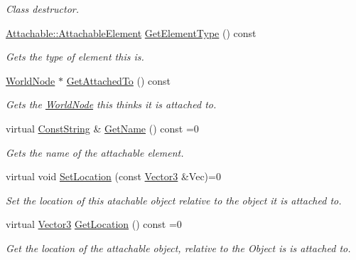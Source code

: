 \begin{DoxyCompactItemize}
\begin{DoxyCompactList}\small\item\em Class destructor. \item\end{DoxyCompactList}\item 
\hyperlink{classphys_1_1Attachable_acd1fca033e7cc0bb3024a92d466d213a}{Attachable::AttachableElement} \hyperlink{classphys_1_1Attachable_a57d60b84bd49bf35732164ae4244e576}{GetElementType} () const 
\begin{DoxyCompactList}\small\item\em Gets the type of element this is. \item\end{DoxyCompactList}\item 
\hyperlink{classphys_1_1WorldNode}{WorldNode} $\ast$ \hyperlink{classphys_1_1Attachable_a6df6034ed61c98d350378bdd7a3129f6}{GetAttachedTo} () const 
\begin{DoxyCompactList}\small\item\em Gets the \hyperlink{classphys_1_1WorldNode}{WorldNode} this thinks it is attached to. \item\end{DoxyCompactList}\item 
virtual \hyperlink{namespacephys_a5ce5049f8b4bf88d6413c47b504ebb31}{ConstString} \& \hyperlink{classphys_1_1Attachable_a0a07d727fa2630dc3550fd991ca28256}{GetName} () const =0
\begin{DoxyCompactList}\small\item\em Gets the name of the attachable element. \item\end{DoxyCompactList}\item 
virtual void \hyperlink{classphys_1_1Attachable_a3555ca694cfc9ff96665c16b3e95c698}{SetLocation} (const \hyperlink{classphys_1_1Vector3}{Vector3} \&Vec)=0
\begin{DoxyCompactList}\small\item\em Set the location of this atachable object relative to the object it is attached to. \item\end{DoxyCompactList}\item 
virtual \hyperlink{classphys_1_1Vector3}{Vector3} \hyperlink{classphys_1_1Attachable_acb410686b2719524eb484b50cc9054a4}{GetLocation} () const =0
\begin{DoxyCompactList}\small\item\em Get the location of the attachable object, relative to the Object is is attached to. \item\end{DoxyCompactList}\end{DoxyCompactItemize}
